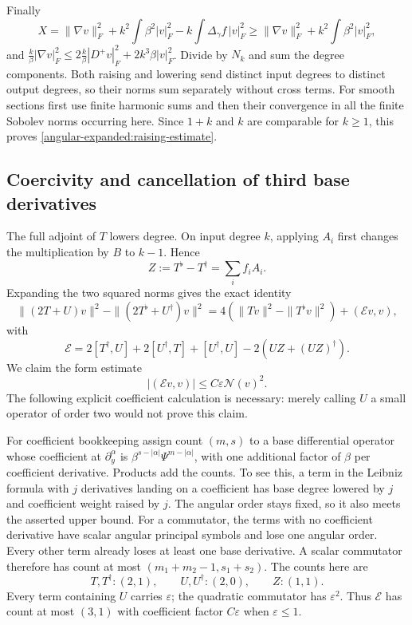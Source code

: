 \documentclass[11pt]{article}
\theoremstyle{definition}
\theoremstyle{remark}
\numberwithin{equation}{section}
\begin{document}
Finally
\[
 X=\|\nabla v\|_F^2+k^2\int\beta^2|v|_F^2
                     -k\int\Delta_\gamma f\,|v|_F^2
 \geq\|\nabla v\|_F^2+k^2\int\beta^2|v|_F^2,
\]
and
$\frac{k}{\beta}|\nabla v|_F^2
\leq2\frac{k}{\beta}|D^+v|_F^2+2k^3\beta|v|_F^2$.
Divide by $N_k$ and sum the degree components.  Both raising and
lowering send distinct input degrees to distinct output degrees, so their
norms sum separately without cross terms.  For smooth sections first use
finite harmonic sums and then their convergence in all the finite Sobolev
norms occurring here.  Since $1+k$ and $k$ are comparable for $k\geq1$,
this proves \eqref{angular-expanded:raising-estimate}.

\subsection{Coercivity and cancellation of third base derivatives}
\label{angular-expanded:coercivity}

The full adjoint of $T$ lowers degree.  On input degree $k$, applying
$A_i$ first changes the multiplication by $B$ to $k-1$.  Hence
\begin{equation}\label{angular-expanded:Z-definition}
 Z:=T^\flat-T^\dagger=\sum_if_iA_i.
\end{equation}
Expanding the two squared norms gives the exact identity
\begin{equation}\label{angular-expanded:norm-comparison}
 \|(2T+U)v\|^2-\|(2T^\flat+U^\dagger)v\|^2
 =4(\|Tv\|^2-\|T^\flat v\|^2)+(\mathcal Ev,v),
\end{equation}
with
\begin{equation}\label{angular-expanded:error-operator}
 \mathcal E=2[T^\dagger,U]+2[U^\dagger,T]+[U^\dagger,U]
                         -2(UZ+(UZ)^\dagger).
\end{equation}
We claim the form estimate
\begin{equation}\label{angular-expanded:error-form-bound}
 |(\mathcal Ev,v)|\leq C\varepsilon\mathcal N(v)^2.
\end{equation}
The following explicit coefficient calculation is necessary: merely calling
$U$ a small operator of order two would not prove this claim.

For coefficient bookkeeping assign count $(m,s)$ to a base differential
operator whose coefficient at $\partial_y^\alpha$ is
$\beta^{s-|\alpha|}\Psi^{m-|\alpha|}$, with one additional factor of
$\beta$ per coefficient derivative.  Products add the counts.  To see
this, a term in the Leibniz formula with $j$ derivatives landing on a
coefficient has base degree lowered by $j$ and coefficient weight raised
by $j$.  The angular order stays fixed, so it also meets the asserted
upper bound.  For a commutator, the terms with no coefficient derivative
have scalar angular principal symbols and lose one angular order.
Every other term already loses at least one base derivative.  A scalar
commutator therefore has count at most $(m_1+m_2-1,s_1+s_2)$.
The counts here are
\[
 T,T^\dagger:(2,1),\qquad U,U^\dagger:(2,0),\qquad Z:(1,1).
\]
Every term containing $U$ carries $\varepsilon$; the quadratic
commutator has $\varepsilon^2$.  Thus $\mathcal E$ has count at most
$(3,1)$ with coefficient factor $C\varepsilon$ when $\varepsilon\leq1$.
\end{document}
